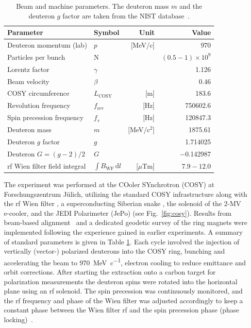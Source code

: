 \documentclass[
    10pt,
    twocolumn,
    secnumarabic,
    amssymb,
    nobibnotes,
    aps,
    prl,

    longbibliography,
    superscriptaddress
    ]{revtex4-2}
\begin{document}
\begin{table}[t]
\centering
\caption{Beam and machine parameters. The deuteron mass $m$ and the deuteron $g$ factor are taken from the NIST database~\cite{NIST_database}.}
\begin{tabular}{llrr}
\hline
\textbf{Parameter} & \textbf{Symbol} & \textbf{Unit} & \textbf{Value} \\
\hline
Deuteron momentum (lab) & $p$ & [MeV/c] & \SI{970}{}  \\
Particles per bunch &N& & $(0.5-1)\times 10^{9}$ \\
Lorentz factor & $\gamma$ & & 1.126  \\
Beam velocity & $\beta$ & & 0.46  \\
COSY circumference & $L_{\mathrm{COSY}}$ & [m] & \SI{183.6}{}  \\
Revolution frequency & $f_{\mathrm{rev}}$ & [Hz] & \SI{750602.6}{}  \\
Spin precession frequency & $f_s$ & [Hz] & \SI{120847.3}{}  \\
Deuteron mass & $m$ & [MeV/c$^2$] & \SI{1875.61}{} \\
Deuteron $g$ factor & $g$ && \SI{1.714025}{}  \\
Deuteron $G = (g - 2)/2$ & $G$ && \SI{-0.142987}{}  \\
rf Wien filter field integral & $\int B_{\text{WF}}\,\text{d}l$ & [$\mu$Tm] & $7.9-12.0$ \\
\hline
\end{tabular}
\label{tab:beam_params}
\end{table}

The experiment was performed at the COoler SYnchrotron (COSY) at Forschungszentrum Jülich, utilizing the standard COSY infrastructure along with the rf Wien filter \cite{Slim:2016pim}, a superconducting Siberian snake \cite{Lehrach:556296,Lehrach:826216}, the solenoid of the 2-MV e-cooler, and the JEDI Polarimeter (JePo) \cite{Mueller_2020} (see Fig.~\ref{fig:cosy}).
Results from beam-based alignment~\cite{Wagner_2021} and a dedicated geodetic survey of the ring magnets
were implemented following the experience gained in earlier experiments.
A summary of standard parameters is given in Table \ref{tab:beam_params}. Each cycle involved the injection of vertically (vector-) polarized deuterons into the COSY ring, bunching and accelerating the beam to \qty{970}{\MeV\per c}, electron cooling to reduce emittance
and orbit corrections. After starting the extraction onto a carbon target for polarization measurements the deuteron spins were rotated into the horizontal plane using an rf solenoid. The spin precession was continuously monitored, and the rf frequency and phase of the Wien filter was adjusted accordingly to keep a constant phase between the Wien filter rf and the spin precession phase (phase locking)~\cite{Eversmann:2015jnk,PhysRevAccelBeams.28.062801}.
\end{document}
